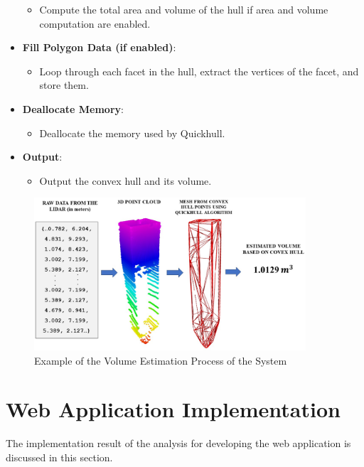 \begin{itemize}
\begin{itemize}
		      \item Compute the total area and volume of the hull if area and volume computation are enabled.
	      \end{itemize}
	\item \textbf{Fill Polygon Data (if enabled)}:
	      \begin{itemize}
		      \item Loop through each facet in the hull, extract the vertices of the facet, and store them.
	      \end{itemize}
	\item \textbf{Deallocate Memory}:
	      \begin{itemize}
		      \item Deallocate the memory used by Quickhull.
	      \end{itemize}
	\item \textbf{Output}:
	      \begin{itemize}
		      \item Output the convex hull and its volume.
	      \end{itemize}
\end{itemize}

\vspace{1cm}

\begin{figure}[H]
	\centering
	\includegraphics[width=0.9\textwidth]{Figures/volume-estimation-example}
	\caption{Example of the Volume Estimation Process of the System}
	\label{ch4:fig:volume-estimation-example}
\end{figure}

\section{Web Application Implementation}
The implementation result of the analysis for developing the web application is discussed in this section.

